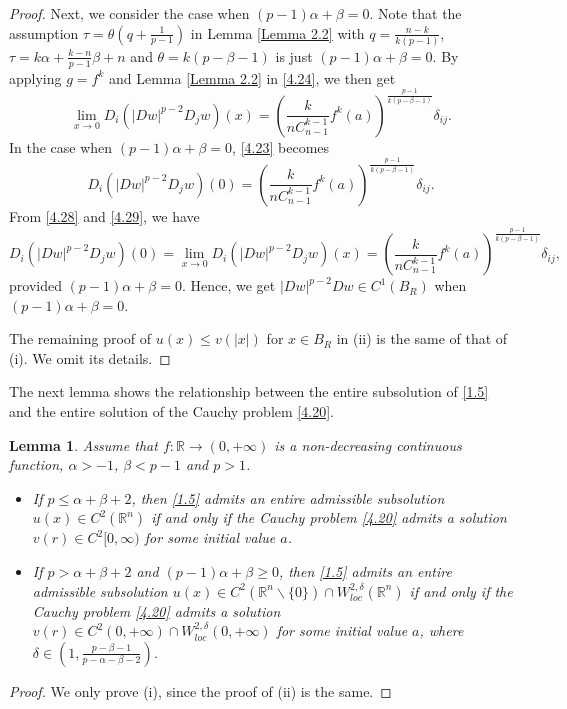 \documentclass[a4paper,11pt]{amsart}
\theoremstyle{plain}
\newtheorem{Lemma}{Lemma}[section]
\theoremstyle{remark}
\numberwithin{equation}{section}
\numberwithin{figure}{section}
\numberwithin{remark}{section}
\begin{document}
\begin{sloppypar}
\begin{proof}
Next, we consider the case when $(p-1)\alpha +\beta=0$.
Note that the assumption $\tau = \theta (q+\frac{1}{p-1})$ in Lemma \ref{Lemma 2.2} with $q=\frac{n-k}{k(p-1)}$, $\tau =k\alpha+\frac{k-n}{p-1}\beta+n$ and $\theta =k(p-\beta-1)$ is just $(p-1)\alpha +\beta=0$. By applying $g=f^k$ and Lemma \ref{Lemma 2.2} in \eqref{4.24}, we then get
\begin{equation}\label{4.28}
\lim_{x\to 0}D_i(|Dw|^{p-2}D_jw)(x) = \left( \frac{k}{n C_{n-1}^{k-1}} f^k(a) \right)^{\frac{p-1}{k(p-\beta-1)}} \delta_{ij}.
\end{equation}
In the case when $(p-1)\alpha +\beta=0$, \eqref{4.23} becomes
\begin{equation}\label{4.29}
D_i(|Dw|^{p-2}D_jw)(0)=\left( \frac{k}{n C_{n-1}^{k-1}} f^k(a) \right)^{\frac{p-1}{k(p-\beta-1)}} \delta_{ij}.
\end{equation}
From \eqref{4.28} and \eqref{4.29}, we have
\begin{equation}\label{4.30}
D_i(|Dw|^{p-2}D_jw)(0) = \lim_{x\to 0}D_i(|Dw|^{p-2}D_jw)(x) =\left( \frac{k}{n C_{n-1}^{k-1}} f^k(a) \right)^{\frac{p-1}{k(p-\beta-1)}} \delta_{ij},
\end{equation}
provided $(p-1)\alpha +\beta=0$. Hence, we get $|Dw|^{p-2}Dw \in C^1(B_R)$ when $(p-1)\alpha +\beta=0$.

The remaining proof of $u(x)\le v(|x|)$ for $x\in B_R$ in (ii) is the same of that of (i). We omit its details.
\end{proof}

The next lemma shows the relationship between the entire subsolution of \eqref{1.5} and the entire solution of the Cauchy problem \eqref{4.20}.
\begin{Lemma}\label{Lemma 4.2}
Assume that $f: \mathbb{R} \to (0,+\infty)$ is a non-decreasing continuous function, $\alpha>-1$, $\beta<p-1$ and $p>1$. 
\begin{itemize}
\item[(i).] If $p\le \alpha + \beta + 2$, then \eqref{1.5} admits an entire admissible subsolution $u(x)\in C^2(\mathbb{R}^n)$ if and only if the Cauchy problem \eqref{4.20} admits a solution $v(r)\in C^2[0,\infty)$ for some initial value $a$.

\item[(ii).] If $p> \alpha + \beta + 2$ and $(p-1)\alpha+\beta \ge 0$, then \eqref{1.5} admits an entire admissible subsolution $u(x)\in C^2(\mathbb{R}^n\backslash \{0\})\cap  W_{loc}^{2,\delta}(\mathbb{R}^n)$ if and only if the Cauchy problem \eqref{4.20} admits a solution $v(r)\in C^2(0, +\infty)\cap W^{2,\delta}_{loc}(0, +\infty)$ for some initial value $a$, where $\delta \in (1, \frac{p-\beta-1}{p-\alpha-\beta-2})$.
\end{itemize}
\end{Lemma}
\begin{proof}
We only prove (i), since the proof of (ii) is the same.


\end{proof}
\end{sloppypar}
\end{document}

